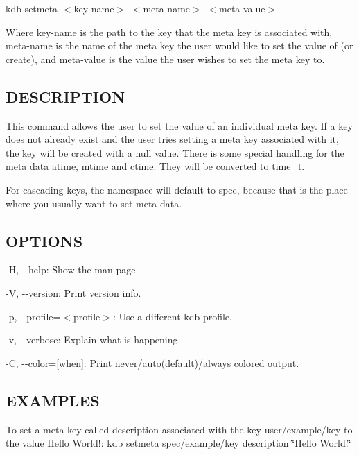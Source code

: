 {\ttfamily kdb setmeta $<$key-\/name$>$ $<$meta-\/name$>$ $<$meta-\/value$>$}

Where {\ttfamily key-\/name} is the path to the key that the meta key is associated with, {\ttfamily meta-\/name} is the name of the meta key the user would like to set the value of (or create), and {\ttfamily meta-\/value} is the value the user wishes to set the meta key to.

\subsection*{D\+E\+S\+C\+R\+I\+P\+T\+I\+O\+N}

This command allows the user to set the value of an individual meta key. If a key does not already exist and the user tries setting a meta key associated with it, the key will be created with a null value. There is some special handling for the meta data atime, mtime and ctime. They will be converted to time\+\_\+t.

For cascading keys, the namespace will default to {\ttfamily spec}, because that is the place where you usually want to set meta data.

\subsection*{O\+P\+T\+I\+O\+N\+S}


\begin{DoxyItemize}
\item {\ttfamily -\/\+H}, {\ttfamily -\/-\/help}\+: Show the man page.
\item {\ttfamily -\/\+V}, {\ttfamily -\/-\/version}\+: Print version info.
\item {\ttfamily -\/p}, {\ttfamily -\/-\/profile}=$<$profile$>$\+: Use a different kdb profile.
\item {\ttfamily -\/v}, {\ttfamily -\/-\/verbose}\+: Explain what is happening.
\item {\ttfamily -\/\+C}, {\ttfamily -\/-\/color}=\mbox{[}when\mbox{]}\+: Print never/auto(default)/always colored output.
\end{DoxyItemize}

\subsection*{E\+X\+A\+M\+P\+L\+E\+S}

To set a meta key called {\ttfamily description} associated with the key {\ttfamily user/example/key} to the value {\ttfamily Hello World!}\+: {\ttfamily kdb setmeta spec/example/key description \char`\"{}\+Hello World!\char`\"{}}

